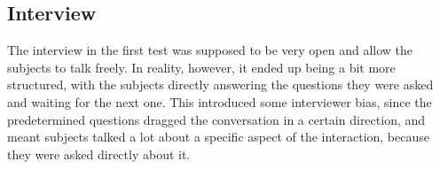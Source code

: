 \subsection{Interview}
The interview in the first test was supposed to be very open and allow the subjects to talk freely. In reality, however, it ended up being a bit more structured, with the subjects directly answering the questions they were asked and waiting for the next one. This introduced some interviewer bias, since the predetermined questions dragged the conversation in a certain direction, and meant subjects talked a lot about a specific aspect of the interaction, because they were asked directly about it.